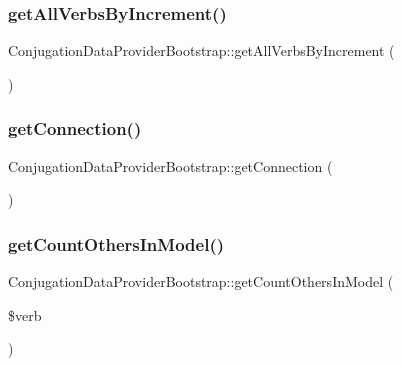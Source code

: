 \hypertarget{class_conjugation_data_provider_bootstrap_a94516c8da8d3dd9ddbfc49ca05b355e3}{}\label{class_conjugation_data_provider_bootstrap_a94516c8da8d3dd9ddbfc49ca05b355e3} 
\subsubsection{\texorpdfstring{get\+All\+Verbs\+By\+Increment()}{getAllVerbsByIncrement()}}
{\footnotesize\ttfamily Conjugation\+Data\+Provider\+Bootstrap\+::get\+All\+Verbs\+By\+Increment (\begin{DoxyParamCaption}{ }\end{DoxyParamCaption})}

\hypertarget{class_conjugation_data_provider_bootstrap_a253604839693a34eb29b54e9356e40ab}{}\label{class_conjugation_data_provider_bootstrap_a253604839693a34eb29b54e9356e40ab} 
\subsubsection{\texorpdfstring{get\+Connection()}{getConnection()}}
{\footnotesize\ttfamily Conjugation\+Data\+Provider\+Bootstrap\+::get\+Connection (\begin{DoxyParamCaption}{ }\end{DoxyParamCaption})\hspace{0.3cm}{\ttfamily [protected]}}

\hypertarget{class_conjugation_data_provider_bootstrap_a23b3628d9f1537f4f21c46e362b4cc97}{}\label{class_conjugation_data_provider_bootstrap_a23b3628d9f1537f4f21c46e362b4cc97} 
\subsubsection{\texorpdfstring{get\+Count\+Others\+In\+Model()}{getCountOthersInModel()}}
{\footnotesize\ttfamily Conjugation\+Data\+Provider\+Bootstrap\+::get\+Count\+Others\+In\+Model (\begin{DoxyParamCaption}\item[{}]{\$verb }\end{DoxyParamCaption})}

